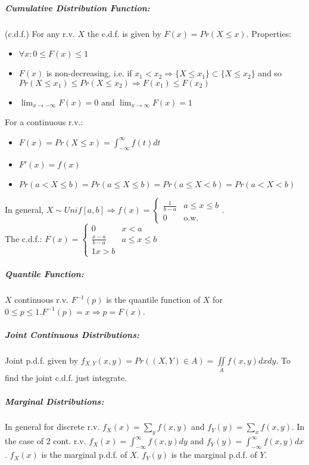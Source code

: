 \documentclass[landscape,10pt]{article}
\begin{document}
\begin{multicols}{3}
    \subparagraph*{Cumulative Distribution Function: } 
        (c.d.f.) For any r.v. $X$ the c.d.f. is given by $F(x) = Pr(X \leq x)$. Properties: 
        \begin{itemize}
            \item[] $\forall x: 0 \leq F(x) \leq 1$
            \item[] $F(x)$ is non-decreasing, i.e. if $x_1 < x_2 \Rightarrow \{X \leq x_1 \} \subset \{X \leq x_2 \}$ and so $Pr(X \leq x_1) \leq Pr(X \leq x_2) \Rightarrow F(x_1) \leq F(x_2)$
            \item[] $\lim_{x \to -\infty} F(x) = 0$ and $\lim_{x \to \infty} F(x) = 1$
        \end{itemize}
        For a continuous r.v.:
        \begin{itemize}
            \item[] $F(x) = Pr(X \leq x) = \int_{-\infty}^{\infty}f(t)dt$
            \item[] $F'(x) = f(x)$
            \item[] $Pr(a < X \leq b) = Pr(a \leq X \leq b) = Pr(a \leq X < b) = Pr(a < X < b)$
        \end{itemize}
    In general, $X \sim Unif[a,b] \Rightarrow f(x) = \begin{cases} \frac{1}{b-a} & a \leq x \leq b \\ 0 & \text{o.w.} \end{cases}$. \\
    The c.d.f.: $F(x) = \begin{cases} 0 & x < a \\ \frac{x-a}{b-a} & a \leq x \leq b \\ 1 x > b \end{cases}$

    \subparagraph*{Quantile Function: }
        $X$ continuous r.v. $F^{-1}(p)$ is the quantile function of $X$ for $0 \leq p \leq 1. F^{-1}(p) = x \Rightarrow p = F(x)$.

    \subparagraph*{Joint Continuous Distributions: }
    Joint p.d.f. given by $f_{X,Y}(x,y) = Pr((X,Y) \in A) = \iint\limits_{A} f(x,y)dxdy$. To find the joint c.d.f. just integrate.

    \subparagraph*{Marginal Distributions: }
        In general for discrete r.v. $f_X(x) = \sum_{y}f(x,y)$ and $f_Y(y) = \sum_{x}f(x,y)$. In the case of 2 cont. r.v. $f_X(x) = \int_{-\infty}^{\infty}f(x,y)dy$ and $f_Y(y) = \int_{-\infty}^{\infty}f(x,y)dx$. $f_X(x)$ is the marginal p.d.f. of $X$. $f_Y(y)$ is the marginal p.d.f. of $Y$.


\end{multicols}
\end{document}
